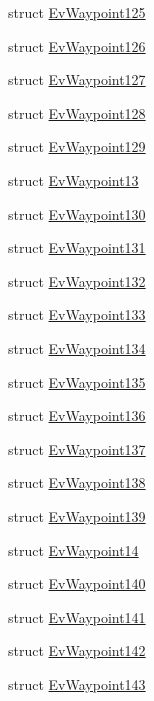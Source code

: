 \begin{DoxyCompactItemize}
\item 
struct \hyperlink{structcl__move__base__z_1_1EvWaypoint125}{Ev\+Waypoint125}
\item 
struct \hyperlink{structcl__move__base__z_1_1EvWaypoint126}{Ev\+Waypoint126}
\item 
struct \hyperlink{structcl__move__base__z_1_1EvWaypoint127}{Ev\+Waypoint127}
\item 
struct \hyperlink{structcl__move__base__z_1_1EvWaypoint128}{Ev\+Waypoint128}
\item 
struct \hyperlink{structcl__move__base__z_1_1EvWaypoint129}{Ev\+Waypoint129}
\item 
struct \hyperlink{structcl__move__base__z_1_1EvWaypoint13}{Ev\+Waypoint13}
\item 
struct \hyperlink{structcl__move__base__z_1_1EvWaypoint130}{Ev\+Waypoint130}
\item 
struct \hyperlink{structcl__move__base__z_1_1EvWaypoint131}{Ev\+Waypoint131}
\item 
struct \hyperlink{structcl__move__base__z_1_1EvWaypoint132}{Ev\+Waypoint132}
\item 
struct \hyperlink{structcl__move__base__z_1_1EvWaypoint133}{Ev\+Waypoint133}
\item 
struct \hyperlink{structcl__move__base__z_1_1EvWaypoint134}{Ev\+Waypoint134}
\item 
struct \hyperlink{structcl__move__base__z_1_1EvWaypoint135}{Ev\+Waypoint135}
\item 
struct \hyperlink{structcl__move__base__z_1_1EvWaypoint136}{Ev\+Waypoint136}
\item 
struct \hyperlink{structcl__move__base__z_1_1EvWaypoint137}{Ev\+Waypoint137}
\item 
struct \hyperlink{structcl__move__base__z_1_1EvWaypoint138}{Ev\+Waypoint138}
\item 
struct \hyperlink{structcl__move__base__z_1_1EvWaypoint139}{Ev\+Waypoint139}
\item 
struct \hyperlink{structcl__move__base__z_1_1EvWaypoint14}{Ev\+Waypoint14}
\item 
struct \hyperlink{structcl__move__base__z_1_1EvWaypoint140}{Ev\+Waypoint140}
\item 
struct \hyperlink{structcl__move__base__z_1_1EvWaypoint141}{Ev\+Waypoint141}
\item 
struct \hyperlink{structcl__move__base__z_1_1EvWaypoint142}{Ev\+Waypoint142}
\item 
struct \hyperlink{structcl__move__base__z_1_1EvWaypoint143}{Ev\+Waypoint143}

\end{DoxyCompactItemize}
